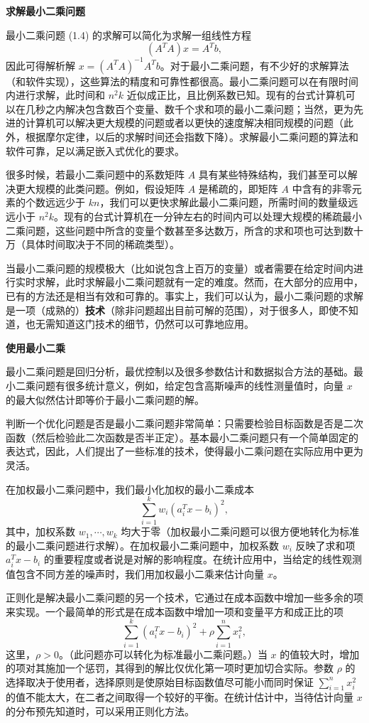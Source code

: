 \documentclass[UTF8, 12pt, fontset=fandol, oneside]{ctexart}
\begin{document}
\noindent\textbf{求解最小二乘问题}

最小二乘问题 (1.4) 的求解可以简化为求解一组线性方程
\[
  (A^TA)x=A^Tb,
\]
因此可得解析解 $x=(A^TA)^{-1}A^Tb$。对于最小二乘问题，有不少好的求解算法（和软件实现），这些算法的精度和可靠性都很高。最小二乘问题可以在有限时间内进行求解，此时间和 $n^2k$ 近似成正比，且比例系数已知。现有的台式计算机可以在几秒之内解决包含数百个变量、数千个求和项的最小二乘问题；当然，更为先进的计算机可以解决更大规模的问题或者以更快的速度解决相同规模的问题（此外，根据摩尔定律，以后的求解时间还会指数下降）。求解最小二乘问题的算法和软件可靠，足以满足嵌入式优化的要求。

很多时候，若最小二乘问题中的系数矩阵 $A$ 具有某些特殊结构，我们甚至可以解决更大规模的此类问题。例如，假设矩阵 $A$ 是稀疏的，即矩阵 $A$ 中含有的非零元素的个数远远少于 $kn$，我们可以更快求解此最小二乘问题，所需时间的数量级远远小于 $n^2k$。现有的台式计算机在一分钟左右的时间内可以处理大规模的稀疏最小二乘问题，这些问题中所含的变量个数甚至多达数万，所含的求和项也可达到数十万（具体时间取决于不同的稀疏类型）。

当最小二乘问题的规模极大（比如说包含上百万的变量）或者需要在给定时间内进行实时求解，此时求解最小二乘问题就有一定的难度。然而，在大部分的应用中，已有的方法还是相当有效和可靠的。事实上，我们可以认为，最小二乘问题的求解是一项（成熟的）\textbf{技术}（除非问题超出目前可解的范围），对于很多人，即使不知道，也无需知道这门技术的细节，仍然可以可靠地应用。

\noindent\textbf{使用最小二乘}

最小二乘问题是回归分析，最优控制以及很多参数估计和数据拟合方法的基础。最小二乘问题有很多统计意义，例如，给定包含高斯噪声的线性测量值时，向量 $x$ 的最大似然估计即等价于最小二乘问题的解。

判断一个优化问题是否是最小二乘问题非常简单：只需要检验目标函数是否是二次函数（然后检验此二次函数是否半正定）。基本最小二乘问题只有一个简单固定的表达式，因此，人们提出了一些标准的技术，使得最小二乘问题在实际应用中更为灵活。

在加权最小二乘问题中，我们最小化加权的最小二乘成本
\[
  \sum_{i=1}^k w_i(a_i^Tx-b_i)^2,
\]
其中，加权系数 $w_1,\cdots,w_k$ 均大于零（加权最小二乘问题可以很方便地转化为标准的最小二乘问题进行求解）。在加权最小二乘问题中，加权系数 $w_i$ 反映了求和项 $a_i^Tx-b_i$ 的重要程度或者说是对解的影响程度。在统计应用中，当给定的线性观测值包含不同方差的噪声时，我们用加权最小二乘来估计向量 $x$。

正则化是解决最小二乘问题的另一个技术，它通过在成本函数中增加一些多余的项来实现。一个最简单的形式是在成本函数中增加一项和变量平方和成正比的项
\[
  \sum_{i=1}^k (a_i^Tx-b_i)^2+\rho\sum_{i=1}^n x_i^2,
\]
这里，$\rho>0$。（此问题亦可以转化为标准最小二乘问题。）当 $x$ 的值较大时，增加的项对其施加一个惩罚，其得到的解比仅优化第一项时更加切合实际。参数 $\rho$ 的选择取决于使用者，选择原则是使原始目标函数值尽可能小而同时保证 $\sum_{i=1}^n x_i^2$ 的值不能太大，在二者之间取得一个较好的平衡。在统计估计中，当待估计向量 $x$ 的分布预先知道时，可以采用正则化方法。
\end{document}
